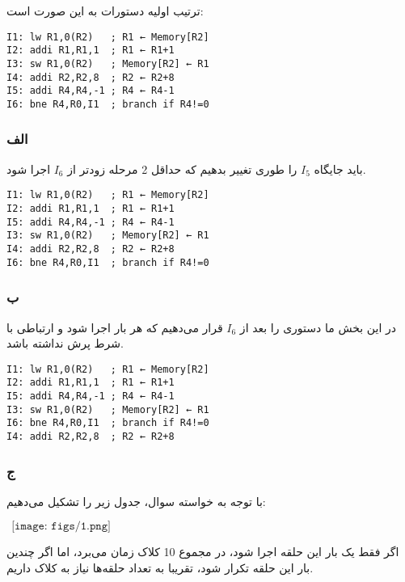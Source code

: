 ترتیب اولیه دستورات به این صورت است:

\setLTR
\begin{lstlisting}
I1: lw R1,0(R2)   ; R1 ← Memory[R2]
I2: addi R1,R1,1  ; R1 ← R1+1
I3: sw R1,0(R2)   ; Memory[R2] ← R1
I4: addi R2,R2,8  ; R2 ← R2+8
I5: addi R4,R4,-1 ; R4 ← R4-1
I6: bne R4,R0,I1  ; branch if R4!=0
\end{lstlisting}
\setRTL

\subsubsection*{الف}
باید جایگاه
$I_5$
را طوری تغییر بدهیم که حداقل 2 مرحله زودتر از 
$I_6$
اجرا شود.

\setLTR
\begin{lstlisting}
I1: lw R1,0(R2)   ; R1 ← Memory[R2]
I2: addi R1,R1,1  ; R1 ← R1+1
I5: addi R4,R4,-1 ; R4 ← R4-1
I3: sw R1,0(R2)   ; Memory[R2] ← R1
I4: addi R2,R2,8  ; R2 ← R2+8
I6: bne R4,R0,I1  ; branch if R4!=0
\end{lstlisting}
\setRTL

\subsubsection*{ب}
در این بخش ما دستوری را بعد از 
$I_6$
قرار می‌دهیم که هر بار اجرا شود و ارتباطی با شرط پرش نداشته باشد.

\setLTR
\begin{lstlisting}
I1: lw R1,0(R2)   ; R1 ← Memory[R2]
I2: addi R1,R1,1  ; R1 ← R1+1
I5: addi R4,R4,-1 ; R4 ← R4-1
I3: sw R1,0(R2)   ; Memory[R2] ← R1
I6: bne R4,R0,I1  ; branch if R4!=0
I4: addi R2,R2,8  ; R2 ← R2+8
\end{lstlisting}
\setRTL

\subsubsection*{ج}

با توجه به خواسته سوال، جدول زیر را تشکیل می‌دهیم:
\setLTR

$ \ \ \texttt{[image: figs/1.png]}$

\setRTL

اگر فقط یک بار این حلقه اجرا شود، در مجموع 10 کلاک زمان می‌برد، اما اگر چندین بار این حلقه تکرار شود، تقریبا به تعداد حلقه‌ها نیاز به کلاک داریم.



